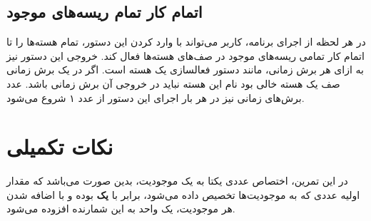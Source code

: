 \documentclass{utap}
\begin{document}
	\linespread{1.6}
	\begin{latin}%
		\centering
		\begin{minipage}[t]{1\textwidth}
			{}
			{}
			{}
		\end{minipage}%
	\end{latin}

	\subsection{اتمام کار تمام ریسه‌های موجود}
	\hspace{5mm}
	در هر لحظه از اجرای برنامه، کاربر می‌تواند با وارد کردن این دستور، تمام هسته‌ها را تا اتمام کار تمامی ریسه‌های موجود در صف‌ها‌ی هسته‌ها فعال کند.
	خروجی این دستور نیز به ازای هر برش زمانی، مانند دستور فعالسازی یک هسته است. اگر در یک برش زمانی صف یک هسته خالی بود نام این هسته نباید در خروجی آن برش زمانی باشد. عدد برش‌های زمانی نیز در هر بار اجرای این دستور از عدد ۱ شروع می‌شود.
	
	\linespread{1.6}
	\begin{latin}%
		\centering
		\begin{minipage}[t]{1\textwidth}
			{}
			{}
		\end{minipage}%
	\end{latin}
	
	\section{نکات تکمیلی}
	\hspace{5mm}
	در این تمرین، اختصاص عددی یکتا به یک موجودیت‌،‌ بدین صورت می‌باشد که مقدار اولیه عددی که به موجودیت‌ها تخصیص داده می‌شود، برابر با \textbf{یک} بوده و با اضافه شدن هر موجودیت، یک واحد به این شمارنده افزوده می‌شود.
	
\end{document}
